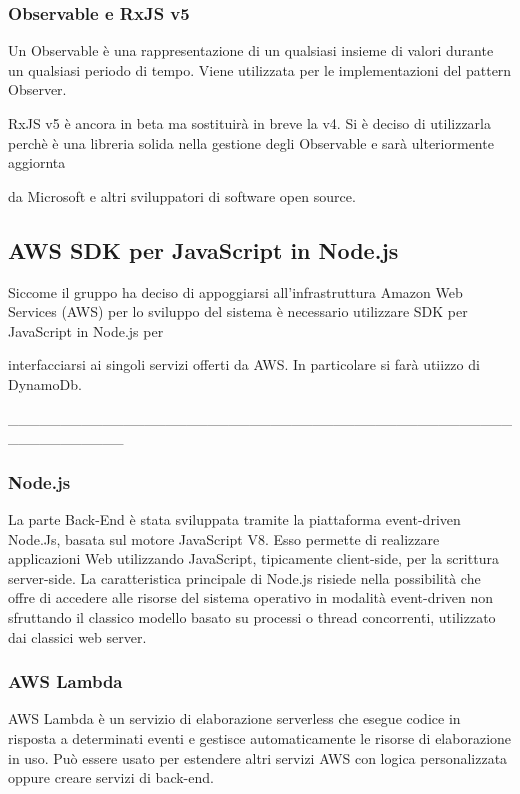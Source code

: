 \subsubsection{Observable e RxJS v5}

Un Observable è una rappresentazione di un qualsiasi insieme di valori durante un qualsiasi periodo di tempo. Viene utilizzata per le implementazioni del pattern Observer.

RxJS v5 è ancora in beta ma sostituirà in breve la v4. Si è deciso di utilizzarla perchè è una libreria solida nella gestione degli Observable e sarà ulteriormente aggiornta

da Microsoft e altri sviluppatori di software open source.


\subsection{AWS SDK per JavaScript in Node.js}

Siccome il gruppo ha deciso di appoggiarsi all'infrastruttura Amazon Web Services (AWS) per lo sviluppo del sistema è necessario utilizzare SDK per JavaScript in Node.js per

interfacciarsi ai singoli servizi offerti da AWS. In particolare si farà utiizzo di DynamoDb.


___________________________________________________________


\subsubsection{Node.js}
La parte Back-End è stata sviluppata tramite la piattaforma event-driven Node.Js, basata sul motore JavaScript V8. Esso permette di realizzare applicazioni Web utilizzando JavaScript, tipicamente client-side, per la scrittura server-side. La caratteristica principale di Node.js risiede nella possibilità che offre di accedere alle risorse del sistema operativo in modalità event-driven non sfruttando il classico modello basato su processi o thread concorrenti, utilizzato dai classici web server.

\subsubsection{AWS Lambda}
AWS Lambda è un servizio di elaborazione serverless che esegue codice in risposta a determinati eventi e gestisce automaticamente le risorse di elaborazione in uso. Può essere usato per estendere altri servizi AWS con logica personalizzata oppure creare servizi di back-end.  

